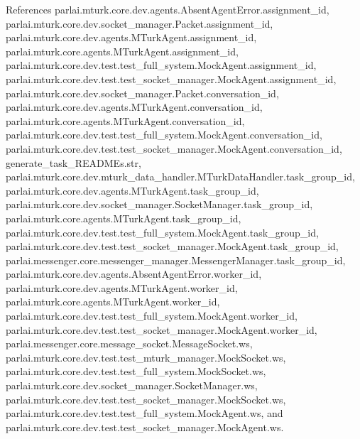 References parlai.\+mturk.\+core.\+dev.\+agents.\+Absent\+Agent\+Error.\+assignment\+\_\+id, parlai.\+mturk.\+core.\+dev.\+socket\+\_\+manager.\+Packet.\+assignment\+\_\+id, parlai.\+mturk.\+core.\+dev.\+agents.\+M\+Turk\+Agent.\+assignment\+\_\+id, parlai.\+mturk.\+core.\+agents.\+M\+Turk\+Agent.\+assignment\+\_\+id, parlai.\+mturk.\+core.\+dev.\+test.\+test\+\_\+full\+\_\+system.\+Mock\+Agent.\+assignment\+\_\+id, parlai.\+mturk.\+core.\+dev.\+test.\+test\+\_\+socket\+\_\+manager.\+Mock\+Agent.\+assignment\+\_\+id, parlai.\+mturk.\+core.\+dev.\+socket\+\_\+manager.\+Packet.\+conversation\+\_\+id, parlai.\+mturk.\+core.\+dev.\+agents.\+M\+Turk\+Agent.\+conversation\+\_\+id, parlai.\+mturk.\+core.\+agents.\+M\+Turk\+Agent.\+conversation\+\_\+id, parlai.\+mturk.\+core.\+dev.\+test.\+test\+\_\+full\+\_\+system.\+Mock\+Agent.\+conversation\+\_\+id, parlai.\+mturk.\+core.\+dev.\+test.\+test\+\_\+socket\+\_\+manager.\+Mock\+Agent.\+conversation\+\_\+id, generate\+\_\+task\+\_\+\+R\+E\+A\+D\+M\+Es.\+str, parlai.\+mturk.\+core.\+dev.\+mturk\+\_\+data\+\_\+handler.\+M\+Turk\+Data\+Handler.\+task\+\_\+group\+\_\+id, parlai.\+mturk.\+core.\+dev.\+agents.\+M\+Turk\+Agent.\+task\+\_\+group\+\_\+id, parlai.\+mturk.\+core.\+dev.\+socket\+\_\+manager.\+Socket\+Manager.\+task\+\_\+group\+\_\+id, parlai.\+mturk.\+core.\+agents.\+M\+Turk\+Agent.\+task\+\_\+group\+\_\+id, parlai.\+mturk.\+core.\+dev.\+test.\+test\+\_\+full\+\_\+system.\+Mock\+Agent.\+task\+\_\+group\+\_\+id, parlai.\+mturk.\+core.\+dev.\+test.\+test\+\_\+socket\+\_\+manager.\+Mock\+Agent.\+task\+\_\+group\+\_\+id, parlai.\+messenger.\+core.\+messenger\+\_\+manager.\+Messenger\+Manager.\+task\+\_\+group\+\_\+id, parlai.\+mturk.\+core.\+dev.\+agents.\+Absent\+Agent\+Error.\+worker\+\_\+id, parlai.\+mturk.\+core.\+dev.\+agents.\+M\+Turk\+Agent.\+worker\+\_\+id, parlai.\+mturk.\+core.\+agents.\+M\+Turk\+Agent.\+worker\+\_\+id, parlai.\+mturk.\+core.\+dev.\+test.\+test\+\_\+full\+\_\+system.\+Mock\+Agent.\+worker\+\_\+id, parlai.\+mturk.\+core.\+dev.\+test.\+test\+\_\+socket\+\_\+manager.\+Mock\+Agent.\+worker\+\_\+id, parlai.\+messenger.\+core.\+message\+\_\+socket.\+Message\+Socket.\+ws, parlai.\+mturk.\+core.\+dev.\+test.\+test\+\_\+mturk\+\_\+manager.\+Mock\+Socket.\+ws, parlai.\+mturk.\+core.\+dev.\+test.\+test\+\_\+full\+\_\+system.\+Mock\+Socket.\+ws, parlai.\+mturk.\+core.\+dev.\+socket\+\_\+manager.\+Socket\+Manager.\+ws, parlai.\+mturk.\+core.\+dev.\+test.\+test\+\_\+socket\+\_\+manager.\+Mock\+Socket.\+ws, parlai.\+mturk.\+core.\+dev.\+test.\+test\+\_\+full\+\_\+system.\+Mock\+Agent.\+ws, and parlai.\+mturk.\+core.\+dev.\+test.\+test\+\_\+socket\+\_\+manager.\+Mock\+Agent.\+ws.



